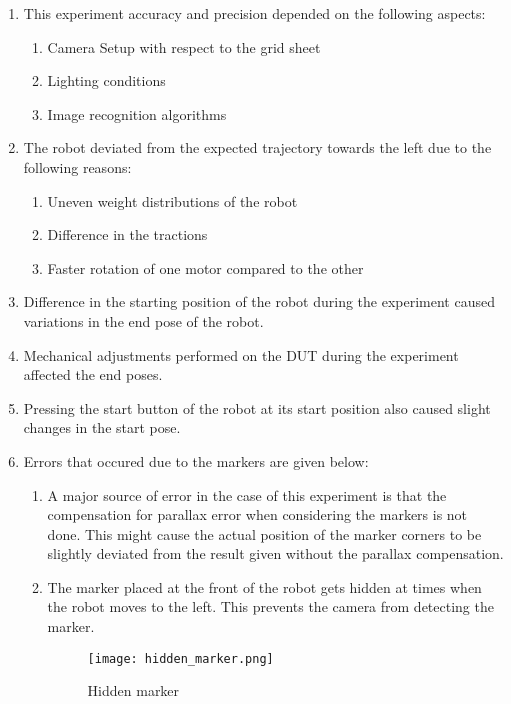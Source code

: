 \documentclass[10pt,a4paper]{article}
\begin{document}
\begin{enumerate}
	\item
	This experiment accuracy and precision depended on the following aspects:
	\begin{enumerate}
		\item
		Camera Setup with respect to the grid sheet
		\item
		Lighting conditions
		\item
		Image recognition algorithms
	\end{enumerate}	 
	\item
	The robot deviated from the expected trajectory towards the left due to the following reasons:
	\begin{enumerate}
		\item
		Uneven weight distributions of the robot
		\item
		Difference in the tractions
		\item
		Faster rotation of one motor compared to the other
	\end{enumerate}
	\item
	Difference in the starting position of the robot during the experiment caused variations in the end pose of the robot.
	\item
	Mechanical adjustments performed on the DUT during the experiment affected the end poses.
	\item
	Pressing the start button of the robot at its start position also caused slight changes in the start pose.
	\item
	Errors that occured due to the markers are given below:
	\begin{enumerate}
		\item
		A major source of error in the case of this experiment is that the compensation for parallax error when considering the markers is not done. This might cause the actual position of the marker corners to be slightly deviated from the result given without the parallax compensation.
		
		\item
		The marker placed at the front of the robot gets hidden at times when the robot moves to the left. This prevents the camera from detecting the marker.
		
		\vspace{0.5cm}
		
		\begin{figure}[h]
			\centering
			\texttt{[image: hidden\_marker.png]}
			\caption{ Hidden marker}
		\end{figure}
		

\end{enumerate}
\end{enumerate}
\end{document}
